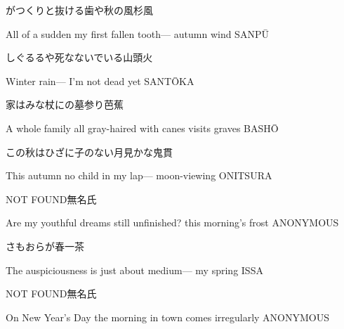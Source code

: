 \begin{haiku}
    {\FH がつくりと抜ける歯や秋の風}\hfill{\FH 杉風}

    \vin{} All of a sudden
    \vin{} \vin{} my first fallen tooth---
    \vin{} \vin{} \vin{} autumn wind \hspace{\fill} SANP\={U}
\end{haiku}

\begin{haiku}
    {\FH しぐるるや死なないでいる}\hfill{\FH 山頭火}

    \vin{} Winter rain---
    \vin{} \vin{} I'm not dead yet \hspace{\fill} SANT\={O}KA
\end{haiku}

\begin{haiku}
    {\FH 家はみな杖にの墓参り}\hfill{\FH 芭蕉}

    \vin{} A whole family
    \vin{} \vin{} all gray-haired with canes
    \vin{} \vin{} \vin{} visits graves \hspace{\fill} BASH\={O}
\end{haiku}

\begin{haiku}
    {\FH この秋はひざに子のない月見かな}\hfill{\FH 鬼貫}

    \vin{} This autumn
    \vin{} \vin{} no child in my lap---
    \vin{} \vin{} \vin{} moon-viewing \hspace{\fill} ONITSURA
\end{haiku}

\begin{haiku}
    {NOT FOUND}\hfill{\FH 無名氏}

    \vin{} Are my youthful dreams
    \vin{} \vin{} still unfinished?
    \vin{} \vin{} \vin{} this morning's frost \hspace{\fill} ANONYMOUS
\end{haiku}

\begin{haiku}
    {\FH {}さもおらが春}\hfill{\FH 一茶}

    \vin{} The auspiciousness
    \vin{} \vin{} is just about medium---
    \vin{} \vin{} \vin{} my spring \hspace{\fill} ISSA
\end{haiku}

\begin{haiku}
    {NOT FOUND}\hfill{\FH 無名氏}

    \vin{} On New Year's Day
    \vin{} \vin{} the morning in town
    \vin{} \vin{} \vin{} comes irregularly \hspace{\fill} ANONYMOUS
\end{haiku}

